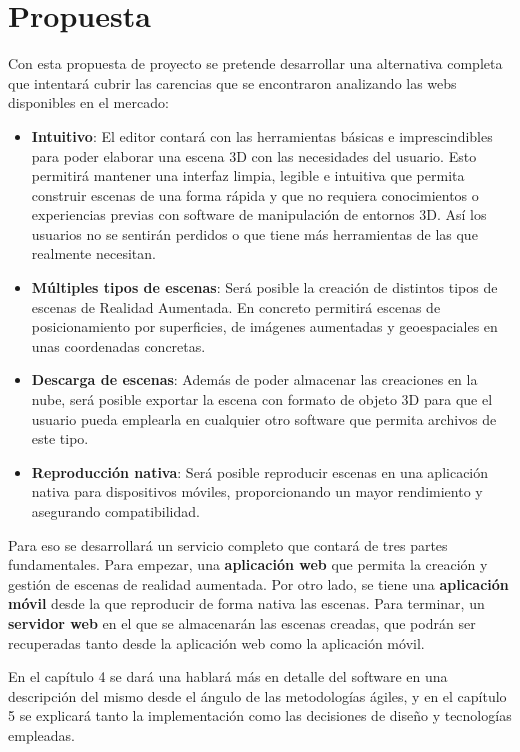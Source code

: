 \section{Propuesta}

Con esta propuesta de proyecto se pretende desarrollar una alternativa completa que intentará cubrir las carencias que se encontraron analizando las webs disponibles en el mercado:

\begin{itemize}
    \item \textbf{Intuitivo}: El editor contará con las herramientas básicas e imprescindibles para poder elaborar una escena 3D con las necesidades del usuario. Esto permitirá mantener una interfaz limpia, legible e intuitiva que permita construir escenas de una forma rápida y que no requiera conocimientos o experiencias previas con software de manipulación de entornos 3D. Así los usuarios no se sentirán perdidos o que tiene más herramientas de las que realmente necesitan.
    \item \textbf{Múltiples tipos de escenas}: Será posible la creación de distintos tipos de escenas de Realidad Aumentada. En concreto permitirá escenas de posicionamiento por superficies, de imágenes aumentadas y geoespaciales en unas coordenadas concretas.
    \item \textbf{Descarga de escenas}: Además de poder almacenar las creaciones en la nube, será posible exportar la escena con formato de objeto 3D para que el usuario pueda emplearla en cualquier otro software que permita archivos de este tipo.
    \item \textbf{Reproducción nativa}: Será posible reproducir escenas en una aplicación nativa para dispositivos móviles, proporcionando un mayor rendimiento y asegurando compatibilidad.
\end{itemize}

Para eso se desarrollará un servicio completo que contará de tres partes fundamentales. Para empezar, una \textbf{aplicación web} que permita la creación y gestión de escenas de realidad aumentada. Por otro lado, se tiene una \textbf{aplicación móvil} desde la que reproducir de forma nativa las escenas. Para terminar, un \textbf{servidor web} en el que se almacenarán las escenas creadas, que podrán ser recuperadas tanto desde la aplicación web como la aplicación móvil.

En el capítulo 4 se dará una hablará más en detalle del software en una descripción del mismo desde el ángulo de las metodologías ágiles, y en el capítulo 5 se explicará tanto la implementación como las decisiones de diseño y tecnologías empleadas.